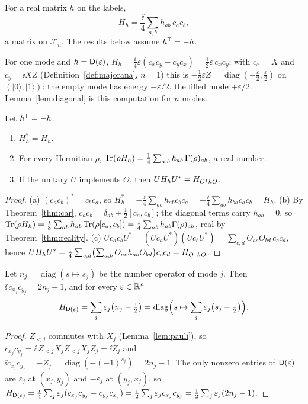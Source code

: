 \begin{definition}\label{def:ham}
For a real matrix $h$ on the labels,
\[
 H_h=\frac\ii4\sum_{a,b}h_{ab}\,c_ac_b ,
\]
a matrix on $\mathcal F_n$. The results below assume $h^{\mathsf T}=-h$.
\end{definition}
For one mode and $h=\mathsf D(\varepsilon)$, $H_h=\tfrac\ii4\varepsilon(c_xc_y-c_yc_x)=\tfrac\ii2\varepsilon\,c_xc_y$;
with $c_x=X$ and $c_y=\ii XZ$ (Definition~\ref{def:majorana}, $n=1$) this is
$-\tfrac12\varepsilon Z=\operatorname{diag}(-\tfrac\varepsilon2,\tfrac\varepsilon2)$ on
$(|0\rangle,|1\rangle)$: the empty mode has energy $-\varepsilon/2$, the filled mode
$+\varepsilon/2$. Lemma~\ref{lem:diagonal} is this computation for $n$ modes.

\begin{lemma}\label{lem:energy}
Let $h^{\mathsf T}=-h$.
\begin{enumerate}
\item[(a)] $H_h^*=H_h$.
\item[(b)] For every Hermitian $\rho$,
$\operatorname{Tr}(\rho H_h)=\tfrac14\sum_{a,b}h_{ab}\,\Gamma(\rho)_{ab}$, a real number.
\item[(c)] If the unitary $U$ implements $O$, then $UH_hU^*=H_{O^{\mathsf T}hO}$.
\end{enumerate}
\end{lemma}
\begin{proof}
(a) $(c_ac_b)^*=c_bc_a$, so
$H_h^*=-\tfrac\ii4\sum_{ab}h_{ab}c_bc_a=-\tfrac\ii4\sum_{ab}h_{ba}c_ac_b=H_h$.
(b) By Theorem~\ref{thm:car}, $c_ac_b=\delta_{ab}+\tfrac12[c_a,c_b]$; the diagonal terms
carry $h_{aa}=0$, so $\operatorname{Tr}(\rho H_h)=\tfrac{\mathrm i}8\sum_{ab}h_{ab}\operatorname{Tr}(\rho[c_a,c_b])
=\tfrac14\sum_{ab}h_{ab}\Gamma(\rho)_{ab}$, real by Theorem~\ref{thm:reality}.
(c) $Uc_ac_bU^*=(Uc_aU^*)(Uc_bU^*)=\sum_{c,d}O_{ac}O_{bd}\,c_cc_d$, hence
$UH_hU^*=\tfrac{\mathrm i}4\sum_{c,d}\bigl(\sum_{a,b}O_{ac}h_{ab}O_{bd}\bigr)c_cc_d=H_{O^{\mathsf T}hO}$.
\end{proof}

\begin{lemma}\label{lem:diagonal}
Let $n_j=\operatorname{diag}(s\mapsto s_j)$ be the number operator of mode $j$. Then
$\ii\,c_{x_j}c_{y_j}=2n_j-1$, and for every $\varepsilon\in\mathbb R^n$
\[
 H_{\mathsf D(\varepsilon)}=\sum_j\varepsilon_j\bigl(n_j-\tfrac12\bigr)
 =\operatorname{diag}\Bigl(s\mapsto\sum_j\varepsilon_j\bigl(s_j-\tfrac12\bigr)\Bigr).
\]
\end{lemma}
\begin{proof}
$Z_{<j}$ commutes with $X_j$ (Lemma~\ref{lem:pauli}), so
$c_{x_j}c_{y_j}=\ii\,Z_{<j}X_jZ_{<j}X_jZ_j=\ii Z_j$ and
$\ii c_{x_j}c_{y_j}=-Z_j=\operatorname{diag}(-(-1)^{s_j})=2n_j-1$. The only nonzero entries of
$\mathsf D(\varepsilon)$ are $\varepsilon_j$ at $(x_j,y_j)$ and $-\varepsilon_j$ at $(y_j,x_j)$, so
$H_{\mathsf D(\varepsilon)}=\tfrac{\mathrm i}4\sum_j\varepsilon_j(c_{x_j}c_{y_j}-c_{y_j}c_{x_j})
=\tfrac{\mathrm i}2\sum_j\varepsilon_jc_{x_j}c_{y_j}=\tfrac12\sum_j\varepsilon_j(2n_j-1)$.
\end{proof}

